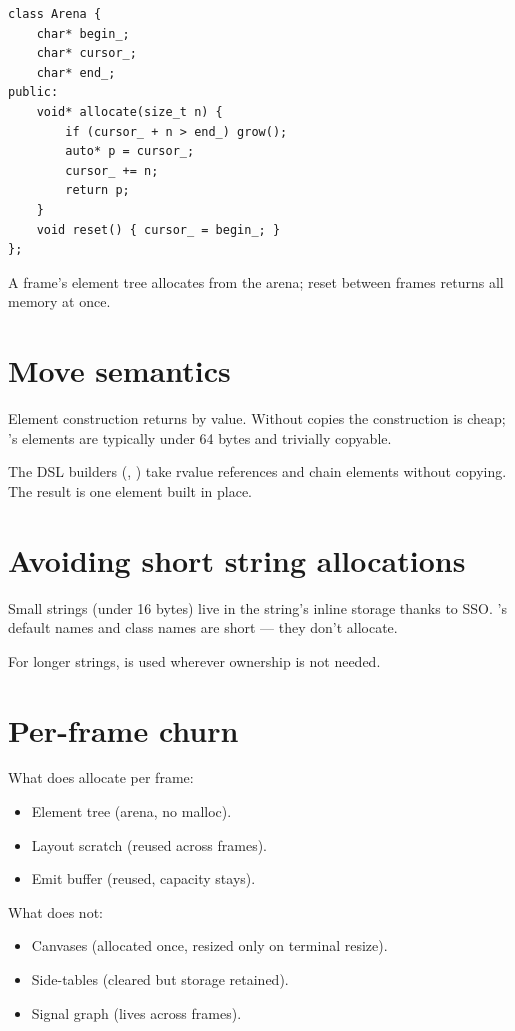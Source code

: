 \begin{lstlisting}
class Arena {
    char* begin_;
    char* cursor_;
    char* end_;
public:
    void* allocate(size_t n) {
        if (cursor_ + n > end_) grow();
        auto* p = cursor_;
        cursor_ += n;
        return p;
    }
    void reset() { cursor_ = begin_; }
};
\end{lstlisting}

A frame's element tree allocates from the arena; reset
between frames returns all memory at once.

\section{Move semantics}

Element construction returns by value. Without copies the
construction is cheap; \maya{}'s elements are typically
under 64 bytes and trivially copyable.

The DSL builders (\code{|}, \code{>>}) take rvalue references
and chain elements without copying. The result is one
element built in place.

\section{Avoiding short string allocations}

Small strings (under 16 bytes) live in the string's inline
storage thanks to SSO. \maya{}'s default  names
and class names are short --- they don't allocate.

For longer strings,  is used wherever
ownership is not needed.

\section{Per-frame churn}

What does allocate per frame:

\begin{itemize}[leftmargin=*]
  \item Element tree (arena, no malloc).
  \item Layout scratch (reused across frames).
  \item Emit buffer (reused, capacity stays).
\end{itemize}

What does not:

\begin{itemize}[leftmargin=*]
  \item Canvases (allocated once, resized only on terminal
    resize).
  \item Side-tables (cleared but storage retained).
  \item Signal graph (lives across frames).
\end{itemize}

